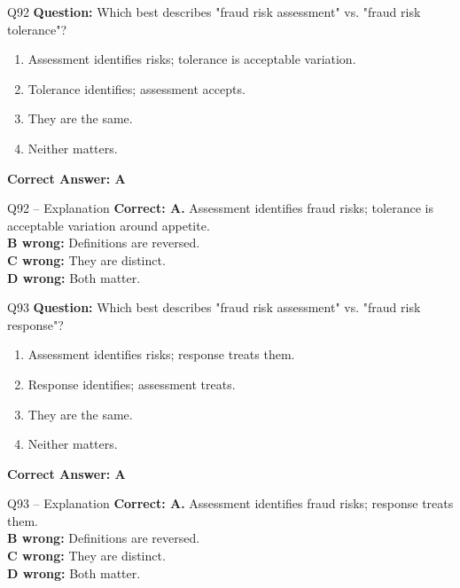 \documentclass[aspectratio=169,10pt]{beamer}
\begin{document}
	\begin{frame}[t]{Q92}
		\small
		\textbf{Question:} Which best describes "fraud risk assessment" vs. "fraud risk tolerance"?
		\begin{enumerate}[label=\Alph*.,itemsep=1pt,topsep=2pt]
			\item Assessment identifies risks; tolerance is acceptable variation.
			\item Tolerance identifies; assessment accepts.
			\item They are the same.
			\item Neither matters.
		\end{enumerate}
		\vspace{4pt}
		\textbf{Correct Answer: A}
	\end{frame}
	
	\begin{frame}[t]{Q92 -- Explanation}
		\small
		\textbf{Correct: A.} Assessment identifies fraud risks; tolerance is acceptable variation around appetite. \\[4pt]
		\textbf{B wrong:} Definitions are reversed. \\[2pt]
		\textbf{C wrong:} They are distinct. \\[2pt]
		\textbf{D wrong:} Both matter.
	\end{frame}
	
	\begin{frame}[t]{Q93}
		\small
		\textbf{Question:} Which best describes "fraud risk assessment" vs. "fraud risk response"?
		\begin{enumerate}[label=\Alph*.,itemsep=1pt,topsep=2pt]
			\item Assessment identifies risks; response treats them.
			\item Response identifies; assessment treats.
			\item They are the same.
			\item Neither matters.
		\end{enumerate}
		\vspace{4pt}
		\textbf{Correct Answer: A}
	\end{frame}
	
	\begin{frame}[t]{Q93 -- Explanation}
		\small
		\textbf{Correct: A.} Assessment identifies fraud risks; response treats them. \\[4pt]
		\textbf{B wrong:} Definitions are reversed. \\[2pt]
		\textbf{C wrong:} They are distinct. \\[2pt]
		\textbf{D wrong:} Both matter.
	\end{frame}
	
\end{document}
